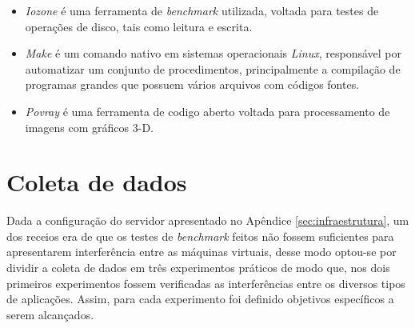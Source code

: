 \begin{itemize}
\item \textit{Iozone} \footnotemark[10] é uma ferramenta de \textit{benchmark} utilizada, voltada para testes de operações de disco, tais como leitura e escrita.

\item \textit{Make} é um comando nativo em sistemas operacionais \textit{Linux}, responsável por automatizar um conjunto de procedimentos, principalmente  a compilação de programas grandes que possuem vários arquivos com códigos fontes. 

\item \textit{Povray} \footnotemark[11] é uma ferramenta de codigo aberto voltada para processamento de imagens com gráficos 3-D.

\end{itemize}



\section{Coleta de dados} 
Dada a configuração do servidor apresentado no Apêndice \ref{sec:infraestrutura}, um dos receios era de que os testes de \textit{benchmark} feitos não fossem suficientes para apresentarem interferência entre as máquinas virtuais, desse modo optou-se por dividir a coleta de dados em três experimentos práticos de modo que, nos dois primeiros experimentos fossem verificadas as interferências entre os diversos tipos de aplicações. Assim, para cada experimento foi definido objetivos específicos a serem alcançados.

